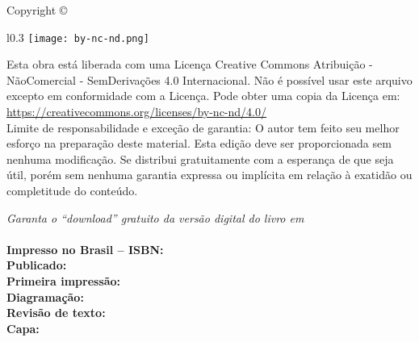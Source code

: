 
\newpage
\thispagestyle{empty}

\noindent Copyright \copyright\ \imprimiryear\ \myauthor\\ %

\begin{wrapfigure}{l}{0.3\textwidth}
\texttt{[image: by-nc-nd.png]}
\end{wrapfigure}
\noindent Esta obra está liberada com uma Licença 
Creative Commons Atribuição - NãoComercial - SemDerivações 4.0 Internacional.
Não é possível usar este arquivo excepto em conformidade com a Licença. 
Pode obter uma copia da Licença em:
\url{https://creativecommons.org/licenses/by-nc-nd/4.0/}\\ %


\noindent Limite de responsabilidade e exceção de garantia: O autor tem feito
seu melhor esforço na preparação deste material.
Esta edição deve ser proporcionada sem nenhuma modificação. 
Se distribui gratuitamente com a esperança de que seja útil, 
porém sem nenhuma garantia expressa ou implícita em relação à exatidão ou completitude do conteúdo.

\noindent \textit{Garanta o ``download'' gratuito da versão digital do livro em \ImprimirLinkHomePageLivro}\\

~\\

\noindent \textbf{Impresso no Brasil -- ISBN:} \imprimirisbn\\ %
\noindent \textbf{Publicado:} \imprimireditora\\ %
\noindent \textbf{Primeira impressão:}  \imprimiryear\\ %
\noindent \textbf{Diagramação:} \myauthor\\ %
\noindent \textbf{Revisão de texto:} \myauthor\\ %
\noindent \textbf{Capa:} \myauthor\\ %
~\\

\vfill

